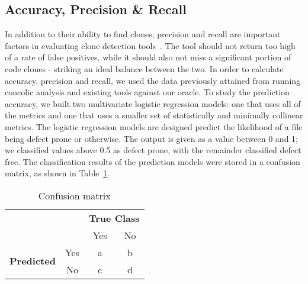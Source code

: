 \documentclass[smallextended]{svjour3}       %
\begin{document}
\begin{table}[thb!]
\begin{center}
\begin{tabular}{r||l|l|l|l|l|l}
\end{tabular}

\end{center}
\end{table}
\subsection{Accuracy, Precision \& Recall}
\label{sec: acc_prec_rec}

In addition to their ability to find clones, precision and recall are important factors in evaluating clone detection tools~\cite{Zibran:2012:IRF:2231936.2231970}. The tool should not return too high of a rate of false positives, while it should also not miss a significant portion of code clones - striking an ideal balance between the two. In order to calculate accuracy, precision and recall, we used the data previously attained from running concolic analysis and existing tools against our oracle. To study the prediction accuracy, we built two multivariate logistic regression models: one that uses all of the metrics and one that uses a smaller set of statistically and minimally collinear metrics. The logistic regression models are designed predict the likelihood of a file being defect prone or otherwise. The output is given as a value between 0 and 1; we classified values above 0.5 as defect prone, with the remainder classified defect free. The classification results of the prediction models were stored in a confusion matrix, as shown in Table~\ref{Table:conf_matrix}.
\begin{table}[h!]
  \centering
\caption{Confusion matrix}
\label{Table:conf_matrix}
  \begin{tabular}{cc|cc}
    & &\multicolumn{2}{c}{\textbf{True  Class}} \\
    \cmidrule(rl){3-4}
    & & Yes & No \\
    \hline
    \multirow{2}{*}{\textbf{Predicted}}
    & Yes & a & b \\
    & No & c & d \\
    \hline
  \end{tabular}

\end{table}
\end{document}
